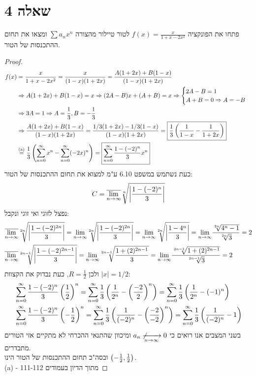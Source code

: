 \documentclass{article}
\begin{document}
	\section*{שאלה 4}
	פתחו את הפונקציה $f(x) = \frac{x}{1 + x - 2x^2}$ לטור טיילור מהצורה $\sum a_nx^n$ ומצאו את תחום ההתכנסות של הטור.
	\begin{proof}
		\begin{align*}
			f(x) &= \frac{x}{1 + x - 2x^2}
			= \frac{x}{(1-x)(1+2x)}
			= \frac{A(1+2x) + B(1-x)}{(1-x)(1+2x)} \\
			&\Rightarrow A(1+2x) + B(1-x) = x
			\Rightarrow (2A-B)x + (A+B) = x
			\Rightarrow \begin{cases}
				2A - B = 1 \\
				A + B = 0 \Rightarrow A = -B
			\end{cases} \\
			&\Rightarrow 3A = 1
			\Rightarrow A = \frac{1}{3},
			B = - \frac{1}{3} \\
			&\Rightarrow
			\frac{A(1+2x) + B(1-x)}{(1-x)(1+2x)}
			= \frac{1/3(1+2x) - 1/3(1-x)}{(1-x)(1+2x)}
			= \boxed{\frac{1}{3} \left( \frac{1}{1-x}- \frac{1}{1+2x} \right)} \\
			&\overset{\text{(a)}}= \frac{1}{3} \left( \sum_{n=0}^\infty x^n - \sum_{n=0}^\infty (-2x)^n \right)
			= \boxed{\sum_{n=0}^\infty \frac{1 - (-2)^n}{3}x^n}
		\end{align*}
		כעת נשתמש במשפט 6.10 ע"מ למצוא את תחום ההתכנסות של הטור:
		\[ C =  \overline{\displaystyle{\lim_{n \to \infty}}} \sqrt[n]{\left| \frac{1 - (-2)^n}{3} \right|}  \]
		נפצל לזוגי ואי זוגי ונקבל:
		\begin{align*}
			&\overline{\displaystyle{\lim_{n \to \infty}}} \sqrt[2n]{\left| \frac{1 - (-2)^{2n}}{3} \right|}
			= \displaystyle{\lim_{n \to \infty}} \sqrt[2n]{\left| \frac{1 - (-2)^{2n}}{3} \right|}
			= \displaystyle{\lim_{n \to \infty}} \sqrt[2n]{\left| \frac{1 - 4^n}{3} \right|}
			= \displaystyle{\lim_{n \to \infty}} \frac{\sqrt[2n]{4^n-1}}{\sqrt[2n]{3}}
			= 2 \\
			&\overline{\displaystyle{\lim_{n \to \infty}}} \sqrt[2n-1]{\left| \frac{1 - (-2)^{2n-1}}{3} \right|}
			= \displaystyle{\lim_{n \to \infty}} \sqrt[2n-1]{\frac{1 + (2)^{2n-1}}{3}}
			= \displaystyle{\lim_{n \to \infty}} \frac{\sqrt[2n-1]{1 + (2)^{2n-1}}}{\sqrt[2n-1]{3}}
			= 2
		\end{align*}
		ולכן $R = \frac{1}{2}$, כעת נבדוק את הקצוות $|x| = 1/2$:
		\begin{align*}
			&\sum_{n=0}^\infty \frac{1 - (-2)^n}{3} \left( \frac{1}{2} \right)^n
			= \sum_{n=0}^\infty \frac{1}{3}\left( \frac{1}{2^n} - \left( \frac{-2}{2} \right)^n \right)
			= \sum_{n=0}^\infty \frac{1}{3}\left( \frac{1}{2^n} - (-1)^n \right) \\
			&\sum_{n=0}^\infty \frac{1 - (-2)^n}{3} \left( -\frac{1}{2} \right)^n
			= \sum_{n=0}^\infty \frac{1}{3}\left( \frac{1}{(-2)^n} - \left( \frac{-2}{-2} \right)^n \right)
			= \sum_{n=0}^\infty \frac{1}{3}\left( \frac{1}{(-2)^n} - 1 \right)
		\end{align*}
		בשני המצבים אנו רואים כי $a_n \not\xrightarrow[n \to \infty]{} 0$ ומיכוון שהתנאי ההכרחי לא מתקיים אזי הטורים מתבדרים. \\
		ובסה"כ תחום ההתכנסות של הטור הינו $\left( -\frac{1}{2}, \frac{1}{2} \right)$. \\
		(a) - מתוך הדיון בעמודים 111-112
	\end{proof}
\end{document}
